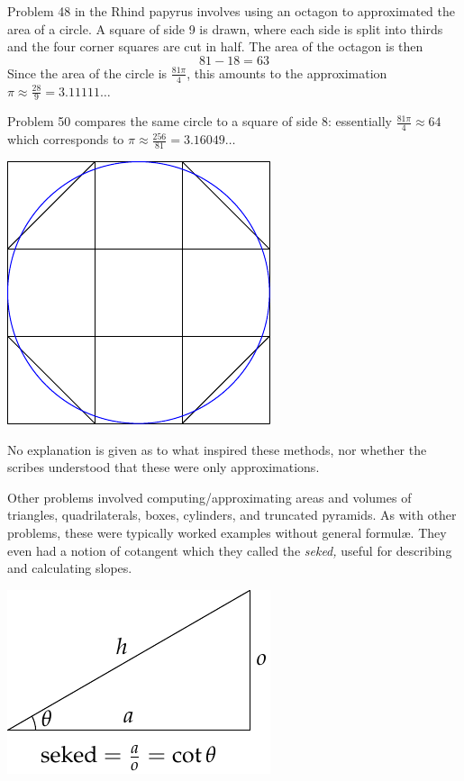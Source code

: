 \begin{minipage}[t]{0.67\linewidth}\vspace{0pt}
	
	Problem 48 in the Rhind papyrus involves using an octagon to approximated the area of a circle. A square of side 9 is drawn, where each side is split into thirds and the four corner squares are cut in half. The area of the octagon is then \[81-18=63\]
	Since the area of the circle is $\frac{81\pi}4$, this amounts to the approximation $\pi\approx\frac{28}9=3.11111\ldots$\smallbreak
	
	Problem 50 compares the same circle to a square of side 8: essentially $\frac{81\pi}4\approx 64$ which corresponds to $\pi\approx \frac{256}{81}=3.16049\ldots$
\end{minipage}
\hfill
\begin{minipage}[t]{0.32\linewidth}\vspace{0pt}
	\flushright\includegraphics{egypt-octagon}
\end{minipage}\medbreak


No explanation is given as to what inspired these methods, nor whether the scribes understood that these were only approximations.\smallbreak
\begin{minipage}[t]{0.67\linewidth}\vspace{0pt}
	Other problems involved computing/approximating areas and volumes of triangles, quadrilaterals, boxes, cylinders, and truncated pyramids. As with other problems, these were typically worked examples without general formulæ. They even had a notion of cotangent which they called the \emph{seked,} useful for describing and calculating slopes.
\end{minipage}
\hfill
\begin{minipage}[t]{0.32\linewidth}\vspace{0pt}
	\flushright\includegraphics{geo-01-seked}
\end{minipage}



